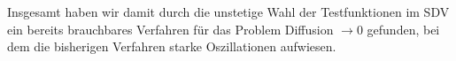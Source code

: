 \begin{figure}[H]
\end{figure}

Insgesamt haben wir damit durch die unstetige Wahl der Testfunktionen im SDV ein bereits brauchbares Verfahren für das Problem Diffusion $\to 0$ gefunden, bei dem die bisherigen Verfahren  starke Oszillationen aufwiesen. 
